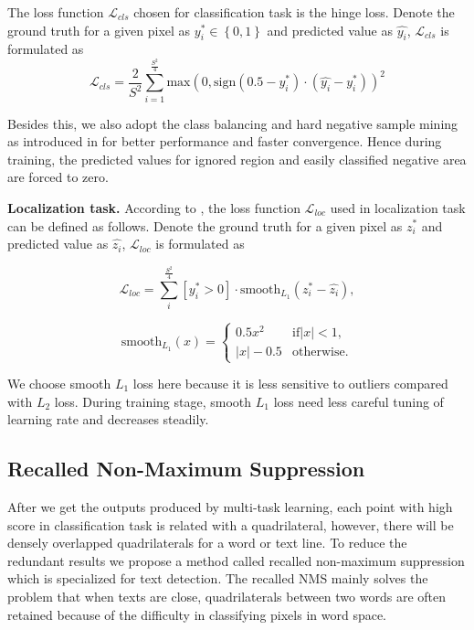 \documentclass[10pt,twocolumn,letterpaper]{article}
\begin{document}
	The loss function $\mathcal{L}_{cls}$ chosen for classification task is the hinge loss. Denote the ground truth for a given pixel as $y^{\ast}_{i} \in \left\{0, 1\right\}$ and predicted value as $\hat{y_{i}}$, $\mathcal{L}_{cls}$ is formulated as
	\begin{equation}
		\mathcal{L}_{cls} = \frac{2}{S^{2}} \sum_{i = 1}^{\frac{S^{2}}{4}} \text{max}\left(0, \text{sign}\left(0.5 - y^{\ast}_{i}\right) \cdot \left(\hat{y_{i}} - y^{\ast}_{i} \right) \right)^{2}
	\end{equation}

	Besides this, we also adopt the class balancing and hard negative sample mining as introduced in \cite{densebox} for better performance and faster convergence. Hence during training, the predicted values for ignored region and easily classified negative area are forced to zero.
	
	\noindent \textbf{Localization task.}
	According to \cite{fast-rcnn}, the loss function $\mathcal{L}_{loc}$ used in localization task can be defined as follows. Denote the ground truth for a given pixel as $z^{\ast}_{i}$ and predicted value as $\hat{z_{i}}$, $\mathcal{L}_{loc}$ is formulated as 
	
	\begin{equation}
		\mathcal{L}_{loc} = \sum_{i}^{\frac{S^2}{4}} \left[y^{\ast}_i > 0\right] \cdot \text{smooth}_{L_1} \left(z^{\ast}_{i} - \hat{z_{i}}\right) ,
	\end{equation}
	
	\begin{equation}
		\text{smooth}_{L_1}\left(x\right) = 
			\left\{\begin{matrix}
			0.5x^2 & \text{if} \left | x \right |  < 1 , \\ 
			\left |x\right | - 0.5 & \text{otherwise} .
			\end{matrix}\right.
	\end{equation}
	
	We choose smooth $L_1$ loss here because it is less sensitive to outliers compared with $L_2$ loss. During training stage, smooth $L_1$ loss need less careful tuning of learning rate and decreases steadily.
	
	
	
	\subsection{Recalled Non-Maximum Suppression}
	\label{Sec.3.3}
	After we get the outputs produced by multi-task learning, each point with high score in classification task is related with a quadrilateral, however, there will be densely overlapped quadrilaterals for a word or text line. To reduce the redundant results we propose a method called recalled non-maximum suppression which is specialized for text detection. The recalled NMS mainly solves the problem that when texts are close, quadrilaterals between two words are often retained because of the difficulty in classifying pixels in word space.
	
\end{document}
